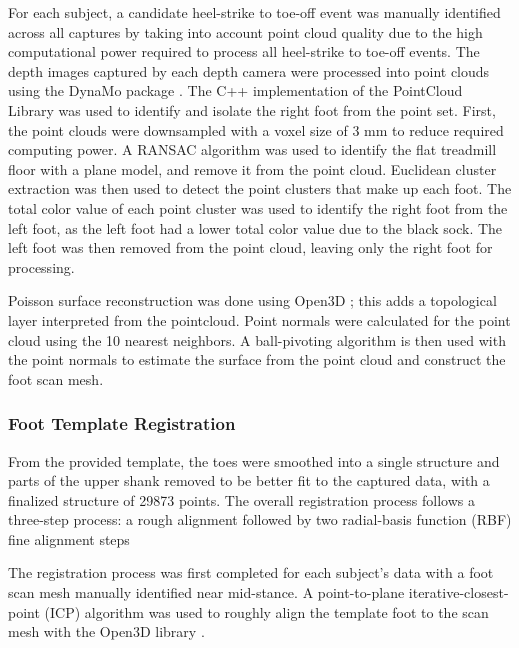 \documentclass[defaultstyle,11pt]{comps}
\begin{document}
For each subject, a candidate heel-strike to toe-off event was manually identified across all captures by taking into account point cloud quality due to the high computational power required to process all heel-strike to toe-off events.
The depth images captured by each depth camera were processed into point clouds using the DynaMo package \citep{Boppana2019}.
The C++ implementation of the PointCloud Library \citep{Rusu2011} was used to identify and isolate the right foot from the point set.
First, the point clouds were downsampled with a voxel size of 3 mm to reduce required computing power.
A RANSAC algorithm \citep{Fischler1981} was used to identify the flat treadmill floor with a plane model, and remove it from the point cloud.
Euclidean cluster extraction was then used to detect the point clusters that make up each foot.
The total color value of each point cluster was used to identify the right foot from the left foot, as the left foot had a lower total color value due to the black sock.
The left foot was then removed from the point cloud, leaving only the right foot for processing.

Poisson surface reconstruction was done using Open3D \citep{Zhou2018}; this adds a topological layer interpreted from the pointcloud.
Point normals were calculated for the point cloud using the 10 nearest neighbors.
A ball-pivoting algorithm \citep{Bernardini1999} is then used with the point normals to estimate the surface from the point cloud and construct the foot scan mesh.

\hypertarget{foot-template-registration}{%
\subsubsection{Foot Template Registration}\label{foot-template-registration}}

From the provided template, the toes were smoothed into a single structure and parts of the upper shank removed to be better fit to the captured data, with a finalized structure of 29873 points.
The overall registration process follows a three-step process: a rough alignment followed by two radial-basis function (RBF) fine alignment steps

The registration process was first completed for each subject's data with a foot scan mesh manually identified near mid-stance.
A point-to-plane iterative-closest-point (ICP) algorithm \citep{Chen1992} was used to roughly align the template foot to the scan mesh with the Open3D library \citep{Zhou2018}.
\end{document}
